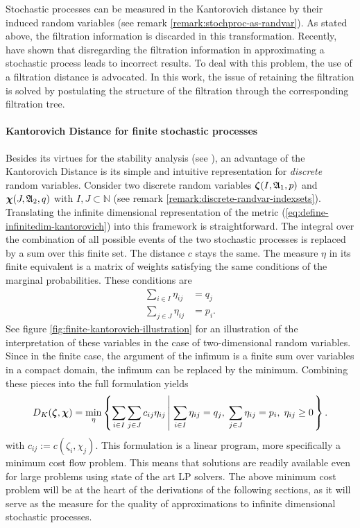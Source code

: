 Stochastic processes can be measured in the Kantorovich distance by their induced random variables (see remark \ref{remark:stochproc-as-randvar}).
As stated above, the filtration information is discarded in this transformation.
Recently,  have shown that disregarding the filtration information in approximating a stochastic process leads to incorrect results.
To deal with this problem, the use of a filtration distance is advocated.
In this work, the issue of retaining the filtration is solved by postulating the structure of the filtration through the corresponding filtration tree.
\paragraph{Kantorovich Distance for finite stochastic processes}
Besides its virtues for the stability analysis (see ), an advantage of the Kantorovich Distance is its simple and intuitive representation for \textit{discrete} random variables.
Consider two discrete random variables $\boldsymbol\zeta(I, \mathfrak{A}_1,p)$ and $\boldsymbol\chi(J, \mathfrak{A}_2,q)$ with $I,J\subset\mathbb{N}$ (see remark \ref{remark:discrete-randvar-indexsets}).
Translating the infinite dimensional representation of the metric (\ref{eq:define-infinitedim-kantorovich}) into this framework is straightforward.
The integral over the combination of all possible events of the two stochastic processes is replaced by a sum over this finite set.
The distance $c$ stays the same.
The measure $\eta$ in its finite equivalent is a matrix of weights satisfying the same conditions of the marginal probabilities.
These conditions are
\begin{align}
  \label{eq:finitedim-marginals-eta}
  \sum_{i\in I} \eta_{ij} &= q_j\\
  \sum_{j\in J} \eta_{ij} &= p_i.
\end{align}
See figure \ref{fig:finite-kantorovich-illustration} for an illustration of the interpretation of these variables in the case of two-dimensional random variables.
Since in the finite case, the argument of the infimum is a finite sum over variables in a compact domain, the infimum can be replaced by the minimum.
Combining these pieces into the full formulation yields
\begin{equation}
  \label{eq:define-finitedim-Kantorovich}
  D_K(\boldsymbol\zeta, \boldsymbol\chi) = \min\limits_{\eta}\left\{\sum_{i\in I}\sum_{j\in J}c_{ij} \eta_{ij}\left|\; \sum_{i\in I}\eta_{ij}=q_j,\;\sum_{j\in J}\eta_{ij}=p_i,\;\eta_{ij}\geq 0\right.\right\}.
\end{equation}
with $c_{ij}:=c(\zeta_i,\chi_j)$.
This formulation is a linear program, more specifically a minimum cost flow problem.
This means that solutions are readily available even for large problems using state of the art LP solvers.
The above minimum cost problem will be at the heart of the derivations of the following sections, as it will serve as the measure for the quality of approximations to infinite dimensional stochastic processes.

